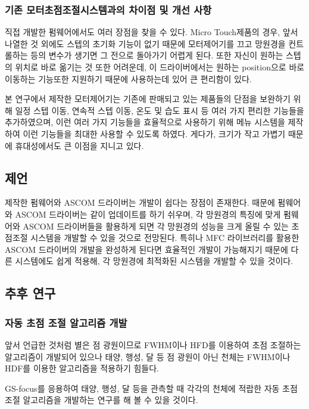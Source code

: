 \subsubsection{기존 모터초점조절시스템과의 차이점 및 개선 사항}
직접 개발한 펌웨어에서도 여러 장점을 찾을 수 있다. Micro Touch제품의 경우, 앞서 나열한 것 외에도 스텝의 초기화 기능이 없기 때문에 모터제어기를 끄고 망원경을 컨트롤하는 등의 변수가 생기면 그 전으로 돌아가기 어렵게 된다. 또한 자신이 원하는 스텝의 위치로 바로 옮기는 것 또한 어려운데, 이 드라이버에서는 원하는 position으로 바로 이동하는 기능또한 지원하기 때문에 사용하는데 있어 큰 편리함이 있다. 

본 연구에서 제작한 모터제어기는 기존에 판매되고 있는 제품들의 단점을 보완하기 위해 일정 스텝 이동, 연속적 스텝 이동, 온도 및 습도 표시 등 여러 가지 편리한 기능들을 추가하였으며, 이런 여러 가지 기능들을 효율적으로 사용하기 위해 메뉴 시스템을 제작하여 이런 기능들을 최대한 사용할 수 있도록 하였다. 게다가, 크기가 작고 가볍기 때문에 휴대성에서도 큰 이점을 지니고 있다.

\subsection{제언}
제작한 펌웨어와 ASCOM 드라이버는 개발이 쉽다는 장점이 존재한다. 때문에 펌웨어와 ASCOM 드라이버는 같이 업데이트를 하기 쉬우며, 각 망원경의 특징에 맞게 펌웨어와 ASCOM 드라이버들을 활용하게 되면 각 망원경의 성능을 크게 올릴 수 있는 초점조절 시스템을 개발할 수 있을 것으로 전망된다.
특히나 MFC 라이브러리를 활용한 ASCOM 드라이버의 개발을 완성하게 된다면 효율적인 개발이 가능해지기 때문에 다른 시스템에도 쉽게 적용해, 각 망원경에 최적화된 시스템을 개발할 수 있을 것이다.


\subsection{추후 연구}


\subsubsection{자동 초점 조절 알고리즘 개발}

앞서 언급한 것처럼 별은 점 광원이므로 FWHM이나 HFD를 이용하여 초점 조절하는 알고리즘이 개발되어 있으나 태양, 행성, 달 등 점 광원이 아닌 천체는 FWHM이나 HDF를 이용한 알고리즘을 적용하기 힘들다. 

GS-focus를 응용하여 태양, 행성, 달 등을 관측할 때 각각의 천체에 적랍한 자동 초점 조절 알고리즘을 개발하는 연구를 해 볼 수 있을 것이다. 


